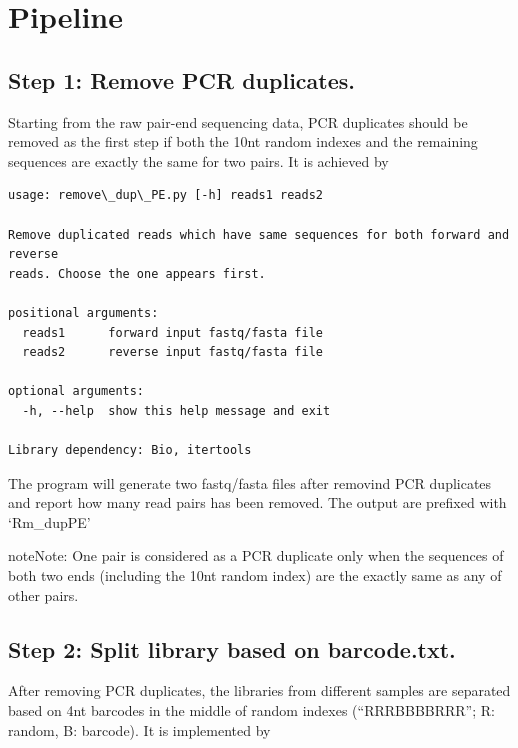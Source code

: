 \documentclass[letterpaper,10pt,english]{sphinxmanual}
\begin{document}
\section{Pipeline}
\label{Analysis_pipeline:pipeline}

\subsection{Step 1: Remove PCR duplicates.}
\label{Analysis_pipeline:step-1-remove-pcr-duplicates}\label{Analysis_pipeline:step1}
Starting from the raw pair-end sequencing data, PCR duplicates should be removed as the first step if both the 10nt random indexes and the remaining sequences are exactly the same for two pairs. It is achieved by 

\begin{Verbatim}[commandchars=\\\{\}]
usage: remove\_dup\_PE.py [-h] reads1 reads2

Remove duplicated reads which have same sequences for both forward and reverse
reads. Choose the one appears first.

positional arguments:
  reads1      forward input fastq/fasta file
  reads2      reverse input fastq/fasta file

optional arguments:
  -h, --help  show this help message and exit

Library dependency: Bio, itertools
\end{Verbatim}

The program will generate two fastq/fasta files after removind PCR duplicates and report how many read pairs has been removed. The output are prefixed with `Rm\_dupPE'

\begin{notice}{note}{Note:}
One pair is considered as a PCR duplicate only when the sequences of both two ends (including the 10nt random index) are the exactly same as any of other pairs.
\end{notice}


\subsection{Step 2: Split library based on barcode.txt.}
\label{Analysis_pipeline:step-2-split-library-based-on-barcode-txt}\label{Analysis_pipeline:step2}
After removing PCR duplicates, the libraries from different samples are separated based on 4nt barcodes in the middle of random indexes (``RRRBBBBRRR''; R: random, B: barcode). It is implemented by 
\end{document}
